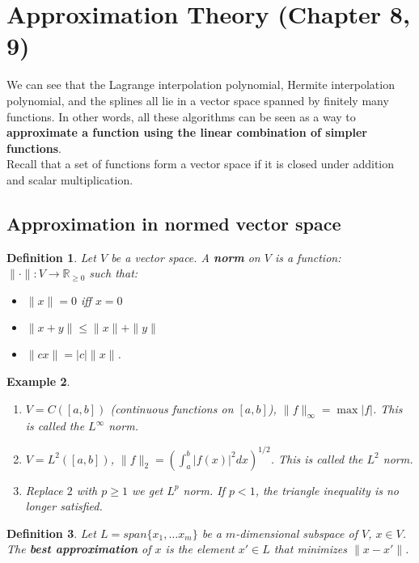 \documentclass[20pt]{article} %
\theoremstyle{break}
\newtheorem{definition}{Definition}[section]
\newtheorem{exa}[definition]{Example}
\begin{document}
\section{Approximation Theory (Chapter 8, 9)}

We can see that the Lagrange interpolation polynomial, Hermite interpolation polynomial, and the splines all lie in a vector space spanned by finitely many functions. In other words, all these algorithms can be seen as a way to {\bf approximate a function using the linear combination of simpler functions}.\\

Recall that a set of functions form a vector space if it is closed under addition and scalar multiplication.

\newpage

\subsection{Approximation in normed vector space}

\begin{definition} Let $V$ be a vector space. A {\bf norm} on $V$ is a function: $\|\cdot \|: V\rightarrow \mathbb{R}_{\geq 0}$ such that:
  \begin{itemize}
  \item $\|x\|=0$ iff $x=0$
  \item $\|x+y\|\leq \|x\|+\|y\|$
  \item $\|cx\|=|c|\|x\|$.
  \end{itemize}
\end{definition}

\begin{exa}
  \begin{enumerate}
   \item $V=C([a, b])$ (continuous functions on $[a, b]$), $\|f\|_\infty=\max|f|$. This is called the $L^\infty$ norm.
   \item $V=L^2([a, b])$, $\|f\|_2=(\int_a^b|f(x)|^2dx)^{1/2}$. This is called the $L^2$ norm.
   \item Replace $2$ with $p\geq 1$ we get $L^p$ norm. If $p<1$, the triangle inequality is no longer satisfied.  
  \end{enumerate}
\end{exa}

\newpage

\begin{definition}
Let $L=span\{x_1, \dots x_m\}$ be a $m$-dimensional subspace of $V$, $x\in V$. The {\bf best approximation} of $x$ is the element $x'\in L$ that minimizes $\|x-x'\|$.  
\end{definition}
\end{document}
